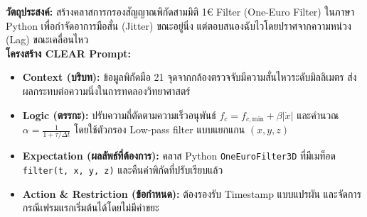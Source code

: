 \begin{aipromptbox}
\textbf{วัตถุประสงค์:} สร้างคลาสการกรองสัญญาณพิกัดสามมิติ 1€ Filter (One-Euro Filter) ในภาษา Python เพื่อกำจัดอาการมือสั่น (Jitter) ขณะอยู่นิ่ง แต่ตอบสนองฉับไวโดยปราศจากความหน่วง (Lag) ขณะเคลื่อนไหว\\
\textbf{โครงสร้าง CLEAR Prompt:}
\begin{itemize}[topsep=1pt, itemsep=1pt, leftmargin=1.2em]
    \item \textbf{Context (บริบท):} ข้อมูลพิกัดมือ 21 จุดจากกล้องตรวจจับมีความสั่นไหวระดับมิลลิเมตร ส่งผลกระทบต่อความนิ่งในการทดลองวิทยาศาสตร์
    \item \textbf{Logic (ตรรกะ):} ปรับความถี่ตัดตามความเร็วอนุพันธ์ $f_c = f_{c,\text{min}} + \beta |\dot{x}|$ และคำนวณ $\alpha = \frac{1}{1 + \tau/\Delta t}$ โดยใช้ตัวกรอง Low-pass filter แบบแยกแกน $(x, y, z)$
    \item \textbf{Expectation (ผลลัพธ์ที่ต้องการ):} คลาส Python \texttt{OneEuroFilter3D} ที่มีเมท็อด \texttt{filter(t, x, y, z)} และคืนค่าพิกัดที่ปรับเรียบแล้ว
    \item \textbf{Action \& Restriction (ข้อกำหนด):} ต้องรองรับ Timestamp แบบแปรผัน และจัดการกรณีเฟรมแรกเริ่มต้นได้โดยไม่มีค่าขยะ
\end{itemize}
\end{aipromptbox}

